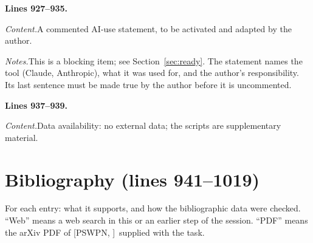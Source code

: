 \documentclass[11pt]{amsart}
\newcommand{\src}[1]{\par\bigskip\noindent\textbf{Lines #1.}\enspace}
\newcommand{\content}{\par\smallskip\noindent\textit{Content.}\enspace}
\newcommand{\notes}{\par\smallskip\noindent\textit{Notes.}\enspace}
\newcommand{\PS}[1][]{[PSWPN\ifx\relax#1\relax\else, #1\fi]}
\begin{document}
\src{927--935}
\content A commented AI-use statement, to be activated and adapted by the author.
\notes This is a blocking item; see Section~\ref{sec:ready}. The statement names the tool (Claude, Anthropic), what it
was used for, and the author's responsibility. Its last sentence must be made true by the author before it is
uncommented.

\src{937--939}
\content Data availability: no external data; the scripts are supplementary material.

\section{Bibliography (lines 941--1019)}\label{sec:bib}

For each entry: what it supports, and how the bibliographic data were checked. ``Web'' means a web search in this or
an earlier step of the session. ``PDF'' means the arXiv PDF of \PS\ supplied with the task.
\end{document}
